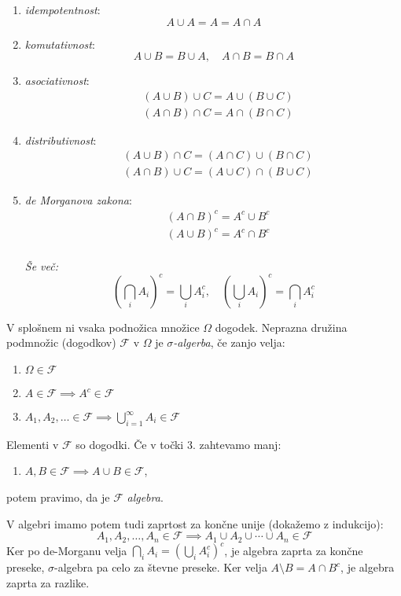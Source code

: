 \documentclass[12pt]{book}
\def\n{\noindent}
\def\s{\vspace{10pt}}
\theoremstyle{definition}
\theoremstyle{plain}
\theoremstyle{plain}
\theoremstyle{plain}
\theoremstyle{remark}
\begin{document}
\begin{enumerate}
    \item \emph{idempotentnost}: $$A \cup A=A=A \cap A$$
    \item \emph{komutativnost}: $$A \cup B=B \cup A, \quad A \cap B=B \cap A$$
    \item \emph{asociativnost}: $$\begin{aligned} & (A \cup B) \cup C=A \cup(B \cup C) \\ & (A \cap B) \cap C=A \cap(B \cap C)\end{aligned}$$
    \item \emph{distributivnost}: $$\begin{aligned} & (A \cup B) \cap C=(A \cap C) \cup(B \cap C) \\ & (A \cap B) \cup C=(A \cup C) \cap(B \cup C)\end{aligned}$$
    \item \emph{de Morganova zakona}: $$\begin{aligned} & (A \cap B)^c=A^c \cup B^c \\ & (A \cup B)^c=A^c \cap B^c\end{aligned}$$ \\ \emph{Še več:} $$ \left(\bigcap_i A_i\right)^c=\bigcup_i A_i^c, \quad \left(\bigcup_i A_i\right)^c=\bigcap_i A_i^c$$
\end{enumerate}

\n V splošnem ni vsaka podnožica množice $\Omega$ dogodek. Neprazna družina podmnožic (dogodkov) $\mathcal{F}$ v $\Omega$ je \emph{$\sigma$-algerba}, če zanjo velja: 

\begin{enumerate}
    \item $\Omega \in \mathcal{F}$
    \item $A \in \mathcal{F} \implies A^c \in \mathcal{F}$
    \item $A_1, A_2, \ldots \in \mathcal{F} \implies \bigcup_{i=1}^{\infty} A_i \in \mathcal{F}$
\end{enumerate}

\n Elementi v $\mathcal{F}$ so dogodki. Če v točki 3. zahtevamo manj: 

\begin{enumerate}[start=3,label={\arabic**.}]
    \item $A, B \in \mathcal{F} \implies A \cup B \in \mathcal{F}$,
\end{enumerate}
potem pravimo, da je $\mathcal{F}$ \emph{algebra}. \s

\n V algebri imamo potem tudi zaprtost za končne unije (dokažemo z indukcijo): 
$$
A_1, A_2, \ldots, A_n \in \mathcal{F} \implies A_1 \cup A_2 \cup \cdots \cup A_n \in \mathcal{F}
$$ 
Ker po de-Morganu velja $\bigcap_i A_i=\left(\bigcup_i A_i^c\right)^c$, je algebra zaprta za končne preseke, $\sigma$-algebra pa celo za števne preseke. Ker velja $A \setminus B=A \cap B^c$, je algebra zaprta za razlike. 
\end{document}
